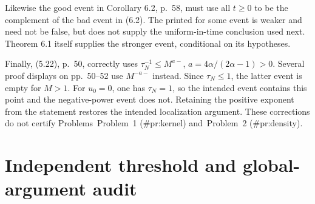 \documentclass[10pt]{article}
\begin{document}
Likewise the good event in Corollary 6.2, p. 58, must use all \(t\ge0\) to be the complement of the bad event in (6.2). The printed for some event is weaker and need not be false, but does not supply the uniform-in-time conclusion used next. Theorem 6.1 itself supplies the stronger event, conditional on its hypotheses.\par
Finally, (5.22), p. 50, correctly uses \(\tau_N^{-1}\le M^{a-}\), \(a=4\alpha/(2\alpha-1)>0\). Several proof displays on pp. 50–52 use \(M^{-a-}\) instead. Since \(\tau_N\le1\), the latter event is empty for \(M>1\). For \(u_0=0\), one has \(\tau_N=1\), so the intended event contains this point and the negative-power event does not. Retaining the positive exponent from the statement restores the intended localization argument. These corrections do not certify Problems Problem 1 (\#pr:kernel) and Problem 2 (\#pr:density).\par
\section*{Independent threshold and global-argument audit}
\end{document}
